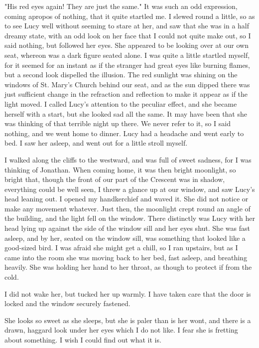 "His red eyes again! They are just the same." It was such an odd expression, coming apropos of nothing, that it quite startled me. I slewed round a little, so as to see Lucy well without seeming to stare at her, and saw that she was in a half dreamy state, with an odd look on her face that I could not quite make out, so I said nothing, but followed her eyes. She appeared to be looking over at our own seat, whereon was a dark figure seated alone. I was quite a little startled myself, for it seemed for an instant as if the stranger had great eyes like burning flames, but a second look dispelled the illusion. The red sunlight was shining on the windows of St. Mary's Church behind our seat, and as the sun dipped there was just sufficient change in the refraction and reflection to make it appear as if the light moved. I called Lucy's attention to the peculiar effect, and she became herself with a start, but she looked sad all the same. It may have been that she was thinking of that terrible night up there. We never refer to it, so I said nothing, and we went home to dinner. Lucy had a headache and went early to bed. I saw her asleep, and went out for a little stroll myself. 

I walked along the cliffs to the westward, and was full of sweet sadness, for I was thinking of Jonathan. When coming home, it was then bright moonlight, so bright that, though the front of our part of the Crescent was in shadow, everything could be well seen, I threw a glance up at our window, and saw Lucy's head leaning out. I opened my handkerchief and waved it. She did not notice or make any movement whatever. Just then, the moonlight crept round an angle of the building, and the light fell on the window. There distinctly was Lucy with her head lying up against the side of the window sill and her eyes shut. She was fast asleep, and by her, seated on the window sill, was something that looked like a good-sized bird. I was afraid she might get a chill, so I ran upstairs, but as I came into the room she was moving back to her bed, fast asleep, and breathing heavily. She was holding her hand to her throat, as though to protect if from the cold. 

I did not wake her, but tucked her up warmly. I have taken care that the door is locked and the window securely fastened. 

She looks so sweet as she sleeps, but she is paler than is her wont, and there is a drawn, haggard look under her eyes which I do not like. I fear she is fretting about something. I wish I could find out what it is. 

